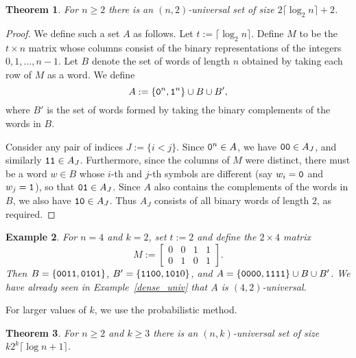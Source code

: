 \documentclass[12pt]{article}
\newtheorem{theorem}{Theorem}
\newtheorem{example}[theorem]{Example}
\begin{document}
\begin{theorem}\label{n2univ}
For $n \geq 2$ there is an $(n,2)$-universal set of size $2\lceil
\log_2 n \rceil + 2$.
\end{theorem}

\begin{proof}
We define such a set $A$ as follows.  Let $t := \lceil
\log_2 n \rceil$.  Define $M$ to be the $t \times n$ matrix
whose columns consist of the binary representations of the integers
$0,1,\ldots,n-1$.  Let $B$ denote the set of words of length $n$
obtained by taking each row of $M$ as a word.  We define
\[
A := \{{\tt 0}^n, {\tt 1}^n\} \cup B \cup B',
\]
where $B'$ is the set of words formed by taking the binary complements of
the words in $B$.

Consider any pair of indices $J := \{i < j\}$.  Since ${\tt 0}^n \in A$, we
have ${\tt 00} \in A_J$, and similarly ${\tt 11} \in A_J$.
Furthermore, since the columns of $M$ were distinct, there must be a
word $w \in B$ whose $i$-th and $j$-th symbols are different (say
$w_i = {\tt 0}$ and $w_j = {\tt 1}$), so that ${\tt 01} \in A_J$.  Since
$A$ also contains the complements of the words in $B$, we also have
${\tt 10} \in A_J$.  Thus $A_J$ consists of all binary words of length
$2$, as required.
\end{proof}

\begin{example}
For $n=4$ and $k=2$, set $t := 2$ and define the $2 \times 4$ matrix
\[
M := \left[
\begin{array}{cccc}
0 & 0 & 1 & 1\\
0 & 1 & 0 & 1
\end{array}
\right].
\]
Then $B = \{{\tt 0011, 0101}\}$, $B' = \{{\tt 1100, 101}0\}$, and
$A = \{{\tt 0000, 1111}\} \cup B \cup B'$.  We have already seen in
Example~\ref{dense_univ} that $A$ is $(4,2)$-universal.
\end{example}

For larger values of $k$, we use the probabilistic method.

\begin{theorem}\label{nkuniv}
For $n \geq 2$ and $k \geq 3$ there is an $(n,k)$-universal set of
size $k2^k\lceil\log n + 1\rceil$.
\end{theorem}
\end{document}
